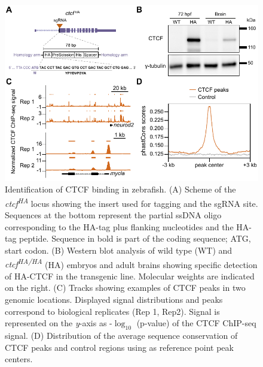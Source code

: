 		\begin{figure}[h!]
			\centering
			\includegraphics{CTCF_paper/Figure_1.pdf}
  			\caption[one]{Identification of CTCF binding in zebrafish.
(A) Scheme of the \textit{ctcf\textsuperscript{HA}} locus showing the insert used for tagging and the sgRNA site. Sequences at the bottom represent the partial ssDNA oligo corresponding to the HA-tag plus flanking nucleotides and the HA-tag peptide. Sequence in bold is part of the coding sequence; ATG, start codon.
(B) Western blot analysis of wild type (WT) and \textit{ctcf\textsuperscript{HA/HA}} (HA) embryos and adult brains showing specific detection of HA-CTCF in the transgenic line. Molecular weights are indicated on the right.
(C) Tracks showing examples of CTCF peaks in two genomic locations. Displayed signal distributions and peaks correspond to biological replicates (Rep 1, Rep2). Signal is represented on the \textit{y}-axis as -$\log_{10}$ (p-value) of the CTCF ChIP-seq signal.
(D) Distribution of the average sequence conservation of CTCF peaks and control regions using as reference point peak centers.}
			\label{one}
		\end{figure}

		\newpage

